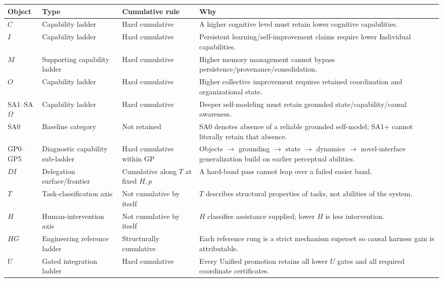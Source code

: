 \documentclass[11pt]{article}
\begin{document}
\small
\begin{tabularx}{\textwidth}{@{}>{\raggedright\arraybackslash}p{}>{\raggedright\arraybackslash}p{}>{\raggedright\arraybackslash}X>{\raggedright\arraybackslash}X@{}}
\toprule
Object & Type & Cumulative rule & Why \\
\midrule
$C$ & Capability ladder & Hard cumulative & A higher cognitive level must retain lower cognitive capabilities. \\
$I$ & Capability ladder & Hard cumulative & Persistent learning/self-improvement claims require lower Individual capabilities. \\
$M$ & Supporting capability ladder & Hard cumulative & Higher memory management cannot bypass persistence/provenance/consolidation. \\
$O$ & Capability ladder & Hard cumulative & Higher collective improvement requires retained coordination and organizational state. \\
SA1--SA$\Omega$ & Capability ladder & Hard cumulative & Deeper self-modeling must retain grounded state/capability/causal awareness. \\
SA0 & Baseline category & Not retained & SA0 denotes absence of a reliable grounded self-model; SA1+ cannot literally retain that absence. \\
GP0--GP5 & Diagnostic capability sub-ladder & Hard cumulative within GP & Objects $\to$ grounding $\to$ state $\to$ dynamics $\to$ novel-interface generalization build on earlier perceptual abilities. \\
$DI$ & Delegation surface/frontier & Cumulative along $T$ at fixed $H, p$ & A hard-band pass cannot leap over a failed easier band. \\
$T$ & Task-classification axis & Not cumulative by itself & $T$ describes structural properties of tasks, not abilities of the system. \\
$H$ & Human-intervention axis & Not cumulative by itself & $H$ classifies assistance supplied; lower $H$ is less intervention. \\
$HG$ & Engineering reference ladder & Structurally cumulative & Each reference rung is a strict mechanism superset so causal harness gain is attributable. \\
$U$ & Gated integration ladder & Hard cumulative & Every Unified promotion retains all lower $U$ gates and all required coordinate certificates. \\
\bottomrule
\end{tabularx}
\normalsize
\end{document}
